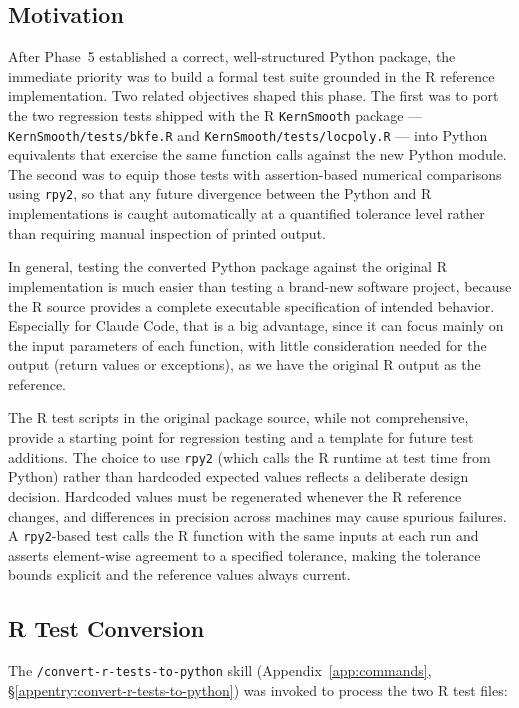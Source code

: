 \documentclass[12pt,a4paper]{article}
\begin{document}
\subsection{Motivation}

After Phase~5 established a correct, well-structured Python package, the immediate priority was to build a formal test suite grounded in the R reference implementation. Two related objectives shaped this phase. The first was to port the two regression tests shipped with the R \texttt{KernSmooth} package --- \texttt{KernSmooth/tests/bkfe.R} and \texttt{KernSmooth/tests/locpoly.R} --- into Python equivalents that exercise the same function calls against the new Python module. The second was to equip those tests with assertion-based numerical comparisons using \texttt{rpy2}, so that any future divergence between the Python and R implementations is caught automatically at a quantified tolerance level rather than requiring manual inspection of printed output.

In general, testing the converted Python package against the original R implementation is much easier than testing a brand-new software project, because the R source provides a complete executable specification of intended behavior. Especially for Claude Code, that is a big advantage, since it can focus mainly on the input parameters of each function, with little consideration needed for the output (return values or exceptions), as we have the original R output as the reference.

The R test scripts in the original package source, while not comprehensive, provide a starting point for regression testing and a template for future test additions. The choice to use \texttt{rpy2} (which calls the R runtime at test time from Python) rather than hardcoded expected values reflects a deliberate design decision. Hardcoded values must be regenerated whenever the R reference changes, and differences in precision across machines may cause spurious failures. A \texttt{rpy2}-based test calls the R function with the same inputs at each run and asserts element-wise agreement to a specified tolerance, making the tolerance bounds explicit and the reference values always current.

\subsection{R Test Conversion}

The \texttt{/convert-r-tests-to-python} skill (Appendix~\ref{app:commands}, \S\ref{appentry:convert-r-tests-to-python}) was invoked to process the two R test files:
\end{document}
